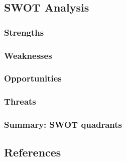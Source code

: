 \documentclass[
  12pt,
  letterpaper,
  DIV=11,
  numbers=noendperiod]{scrartcl}
\begin{document}
\subsection{SWOT Analysis}\label{swot-analysis}

\subsubsection{Strengths}\label{strengths}

\subsubsection{Weaknesses}\label{weaknesses}

\subsubsection{Opportunities}\label{opportunities}

\subsubsection{Threats}\label{threats}

\subsubsection{\texorpdfstring{\textbf{Summary: SWOT
quadrants}}{Summary: SWOT quadrants}}\label{summary-swot-quadrants}

\subsection*{References}\label{references}
\end{document}
